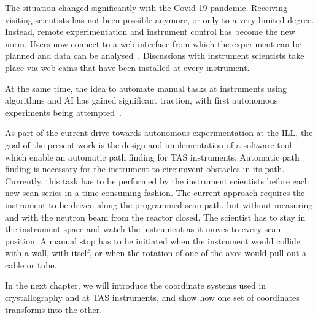 The situation changed significantly with the Covid-19 pandemic. Receiving visiting scientists has not been possible anymore, or only to a very limited degree. Instead, remote experimentation and instrument control has become the new norm. Users now connect to a web interface from which the experiment can be planned and data can be analysed~\cite{web_ill_visa}. Discussions with instrument scientists take place via web-cams that have been installed at every instrument.

At the same time, the idea to automate manual tasks at instruments using algorithms and AI has gained significant traction, with first autonomous experiments being attempted~\cite{web_ill_autonomous2020}.

As part of the current drive towards autonomous experimentation at the ILL, the goal of the present work is the design and implementation of a software tool which enable an automatic path finding for TAS instruments. Automatic path finding is necessary for the instrument to circumvent obstacles in its path. Currently, this task has to be performed by the instrument scientists before each new scan series in a time-consuming fashion. The current approach requires the instrument to be  driven along the programmed scan path, but without measuring and with the neutron beam from the reactor closed. The scientist has to stay in the instrument space and watch the instrument as it moves to every scan position. A manual stop has to be initiated when the instrument would collide with a wall, with itself, or when the rotation of one of the axes would pull out a cable or tube.

In the next chapter, we will introduce the coordinate systems used in crystallography and at TAS instruments, and show how one set of coordinates transforms into the other.
